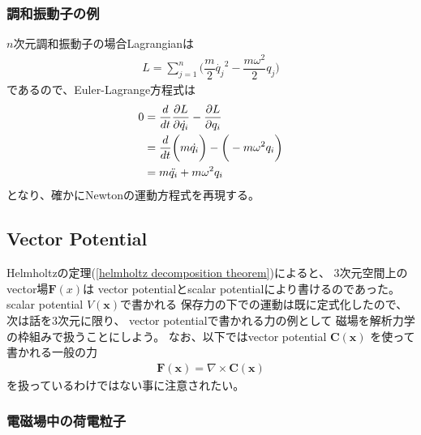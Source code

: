 \subsubsection{調和振動子の例}

$n$次元調和振動子の場合Lagrangianは
\begin{align}
  L = \sum_{j=1}^n
  \bigg(
    \dfrac{m}{2}\dot{q_j}^2
  -
    \dfrac{m\omega^2}{2} q_j
  \bigg)
\label{harmonic oscillator lagrangian}
\end{align}
であるので、Euler-Lagrange方程式は
\begin{align}
  0 &=
  \dfrac{d}{dt}\dfrac{\partial L}{\partial \dot{q_i} }
  - \dfrac{\partial L}{\partial q_i }
\notag\\&=
  \dfrac{d}{dt}
  \bigg(
    m\dot{q_i}
  \bigg)
  -
  \bigg(
  -
    m\omega^2 q_i
  \bigg)
\notag\\&=
    m\ddot{q_i}
  +
    m\omega^2 q_i
\end{align}
となり、確かにNewtonの運動方程式を再現する。

\subsection{Vector Potential}

Helmholtzの定理(\ref{helmholtz decomposition theorem})によると、
$3$次元空間上のvector場$\bm{F}(x)$は
vector potentialとscalar potentialにより書けるのであった。
scalar potential $V(\bm{x})$で書かれる
保存力の下での運動は既に定式化したので、
次は話を$3$次元に限り、
vector potentialで書かれる力の例として
磁場を解析力学の枠組みで扱うことにしよう。
なお、以下ではvector potential
$\bm{C}(\bm{x})$
を使って書かれる一般の力
\begin{align}
  \bm{F}(\bm{x}) = \nabla \times \bm{C}(\bm{x})
\end{align}
を扱っているわけではない事に注意されたい。

\subsubsection{電磁場中の荷電粒子}

